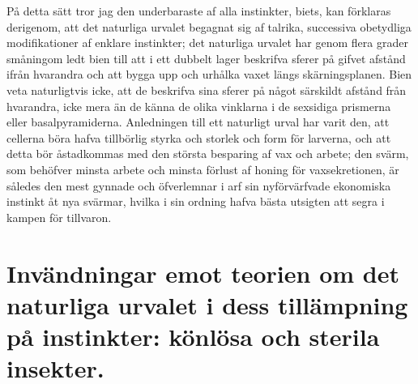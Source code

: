 På detta sätt tror jag den underbaraste af alla instinkter, biets, kan förklaras derigenom, att det naturliga urvalet begagnat sig af talrika, successiva obetydliga modifikationer af enklare instinkter; det naturliga urvalet har genom flera grader småningom ledt bien till att i ett dubbelt lager beskrifva sferer på gifvet afstånd ifrån hvarandra och att bygga upp och urhålka vaxet längs skärningsplanen. Bien veta naturligtvis icke, att de beskrifva sina sferer på något särskildt afstånd från hvarandra, icke mera än de känna de olika vinklarna i de sexsidiga prismerna eller basalpyramiderna. Anledningen till ett naturligt urval har varit den, att cellerna böra hafva tillbörlig styrka och storlek och form för larverna, och att detta bör åstadkommas med den största besparing af vax och arbete; den svärm, som behöfver minsta arbete och minsta förlust af honing för vaxsekretionen, är således den mest gynnade och öfverlemnar i arf sin nyförvärfvade ekonomiska instinkt åt nya svärmar, hvilka i sin ordning hafva bästa utsigten att segra i kampen för tillvaron.



\section[Könlösa och sterila insekter]{Invändningar emot teorien om det naturliga urvalet i
dess tillämpning på instinkter: könlösa och sterila
insekter.}

